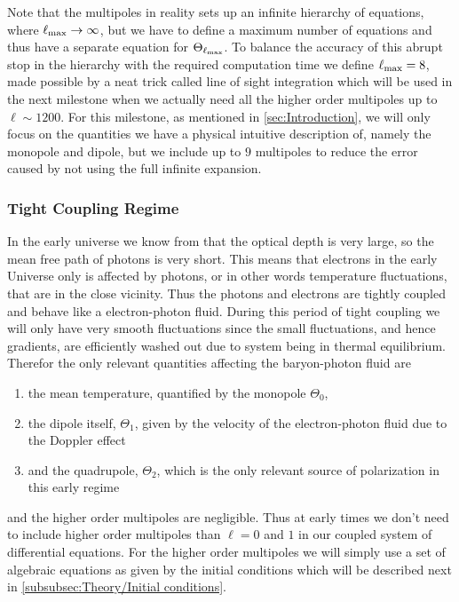 \documentclass[10pt,a4paper]{article}
\begin{document}
\begin{itemize}
Note that the multipoles in reality sets up an infinite hierarchy of equations, where $\ell_{\rm{max}} \rightarrow \infty$, but we have to define a maximum number of equations and thus have a separate equation for $\Theta_{\ell_{\rm{max}}}$. To balance the accuracy of this abrupt stop in the hierarchy with the required computation time we define $\ell_{\rm{max}}=8$, made possible by a neat trick called line of sight integration which will be used in the next milestone when we actually need all the higher order multipoles up to $\ell \sim 1200$. For this milestone, as mentioned in \cref{sec:Introduction}, we will only focus on the quantities we have a physical intuitive description of, namely the monopole and dipole, but we include up to $9$ multipoles to reduce the error caused by not using the full infinite expansion.

\end{itemize}

\subsubsection{Tight Coupling Regime}
\label{subsubsec:Theory/Tight Coupling}
In the early universe we know from \cite{milestone2} that the optical depth is very large, so the mean free path of photons is very short. This means that electrons in the early Universe only is affected by photons, or in other words temperature fluctuations, that are in the close vicinity. Thus the photons and electrons are tightly coupled and behave like a electron-photon fluid. During this period of tight coupling we will only have very smooth fluctuations since the small fluctuations, and hence gradients, are efficiently washed out due to system being in thermal equilibrium. Therefor the only relevant quantities affecting the baryon-photon fluid are
\begin{enumerate}
  \item the mean temperature, quantified by the monopole $\Theta_0$,
  \item the dipole itself,  $\Theta_1$, given by the velocity of the electron-photon fluid due to the Doppler effect
  \item and the quadrupole, $\Theta_2$, which is the only relevant source of polarization in this early regime
\end{enumerate}
and the higher order multipoles are negligible. Thus at early times we don't need to include higher order multipoles than $\ell = 0$ and $1$ in our coupled system of differential equations. For the higher order multipoles we will simply use a set of algebraic equations as given by the initial conditions which will be described next in \cref{subsubsec:Theory/Initial conditions}.
\end{document}
